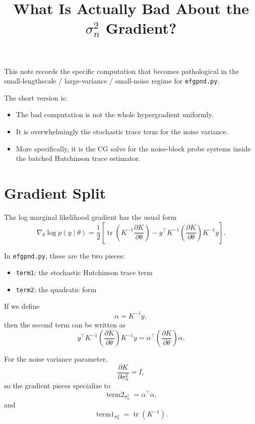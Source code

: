 \documentclass[11pt]{article}
\title{What Is Actually Bad About the $\sigma_n^2$ Gradient?}
\author{}
\date{}
\begin{document}
\maketitle

This note records the specific computation that becomes pathological in the
small-lengthscale / large-variance / small-noise regime for
\texttt{efgpnd.py}.

The short version is:
\begin{itemize}
  \item The bad computation is not the whole hypergradient uniformly.
  \item It is overwhelmingly the stochastic trace term for the noise variance.
  \item More specifically, it is the CG solve for the noise-block probe systems
  inside the batched Hutchinson trace estimator.
\end{itemize}

\section*{Gradient Split}

The log marginal likelihood gradient has the usual form
\begin{equation}
\nabla_\theta \log p(y \mid \theta)
= \frac{1}{2}
\left[
\operatorname{tr}\!\left(K^{-1} \frac{\partial K}{\partial \theta}\right)
- y^\top K^{-1}
\left(\frac{\partial K}{\partial \theta}\right)
K^{-1} y
\right].
\end{equation}

In \texttt{efgpnd.py}, these are the two pieces:
\begin{itemize}
  \item \texttt{term1}: the stochastic Hutchinson trace term
  \item \texttt{term2}: the quadratic form
\end{itemize}

If we define
\begin{equation}
\alpha = K^{-1} y,
\end{equation}
then the second term can be written as
\begin{equation}
y^\top K^{-1}
\left(\frac{\partial K}{\partial \theta}\right)
K^{-1} y
=
\alpha^\top
\left(\frac{\partial K}{\partial \theta}\right)
\alpha.
\end{equation}

For the noise variance parameter,
\begin{equation}
\frac{\partial K}{\partial \sigma_n^2} = I,
\end{equation}
so the gradient pieces specialize to
\begin{equation}
\operatorname{term2}_{\sigma_n^2} = \alpha^\top \alpha,
\end{equation}
and
\begin{equation}
\operatorname{term1}_{\sigma_n^2}
=
\operatorname{tr}(K^{-1}).
\end{equation}
\end{document}
